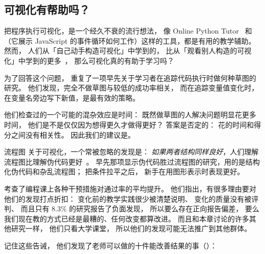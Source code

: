 \subsection*{可视化有帮助吗？}

把程序执行可视化，是一个经久不衰的流行想法，
像 Online Python Tutor~\cite{Guo2013}
和 
（它展示 JavaScript 的事件循环如何工作）这样的工具，都是有用的教学辅助。
然而，
人们从「自己动手构造可视化」中学到的，
比从「观看别人构造的可视化」中学到的更多~\cite{Stas1998,Ceti2016}，
那么可视化真的有助于学习吗？

为了回答这个问题，
\cite{Cunn2017}重复了一项早先关于学习者在追踪代码执行时做何种草图的研究。
他们发现，完全不做草图与较低的成功率相关，
而在追踪变量值变化时，在变量名旁边写下新值，是最有效的策略。

他们检查过的一个可能的混杂效应是时间：
既然做草图的人解决问题明显花更多时间，
他们是不是仅仅因为想得更久才做得更好？
答案是否定的：
花的时间和得分之间没有相关性。
因此我们的建议是。

\begin{aside}{流程图}
  关于可视化，一个常被忽略的发现是：
  \emph{如果两者结构同样良好}，人们理解流程图比理解伪代码更好~\cite{Scan1989}。
  早先那项显示伪代码胜过流程图的研究，用的是结构化伪代码和杂乱流程图；
  把条件拉平之后，
  新手在用图形表示时表现更好。
\end{aside}


\cite{Viha2014}考查了编程课上各种干预措施对通过率的平均提升。
他们指出，有很多理由要对他们的发现打点折扣：
变化前的教学实践很少被清楚说明、
变化的质量没有被评判、
而且只有 8.3\% 的研究报告了负面发现，
所以要么存在正向报告偏差，
要么我们现在教的方式已经是最糟的、任何改变都算改进。
而且和本章讨论的许多其他研究一样，
他们只看大学课堂，
所以他们的发现可能无法推广到其他群体。

记住这些告诫，
他们发现了老师可以做的十件能改善结果的事（）：

